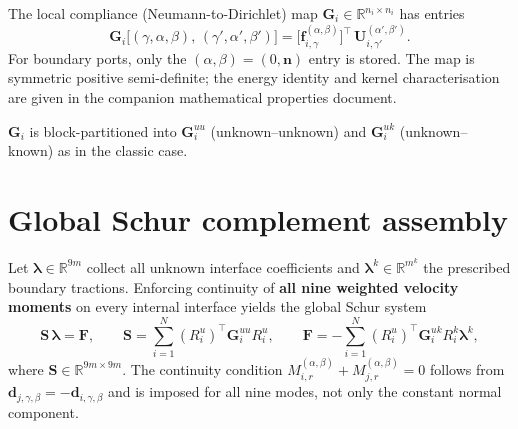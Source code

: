 \documentclass[11pt,a4paper]{article}
\newcommand{\R}{\mathbb{R}}
\newcommand{\normal}{\bm{n}}
\newcommand{\trac}{\bm{\lambda}}
\newcommand{\DtN}{\mathbf{G}}
\newcommand{\Schur}{\mathbf{S}}
\begin{document}
The local compliance (Neumann-to-Dirichlet) map
$\DtN_i \in \R^{n_i \times n_i}$ has entries
\begin{equation}\label{eq:dtn}
  \DtN_i\bigl[(\gamma,\alpha,\beta),\,(\gamma',\alpha',\beta')\bigr]
  = \bigl[\bm{f}_{i,\gamma}^{(\alpha,\beta)}\bigr]^\top\,
    \mathbf{U}_{i,\gamma'}^{(\alpha',\beta')}.
\end{equation}
For boundary ports, only the $(\alpha,\beta)=(0,\normal)$ entry is stored.
The map is symmetric positive semi-definite; the energy identity and
kernel characterisation are given in the companion mathematical
properties document.

$\DtN_i$ is block-partitioned into $\DtN_i^{uu}$ (unknown--unknown) and
$\DtN_i^{uk}$ (unknown--known) as in the classic case.

\section{Global Schur complement assembly}

Let $\trac \in \R^{9m}$ collect all unknown interface coefficients and
$\trac^k \in \R^{m^k}$ the prescribed boundary tractions.
Enforcing continuity of \textbf{all nine weighted velocity moments} on
every internal interface yields the global Schur system
\begin{equation}\label{eq:schur}
  \Schur\,\trac = \bm{F},\qquad
  \Schur = \sum_{i=1}^N (R_i^u)^\top \DtN_i^{uu} R_i^u,\qquad
  \bm{F} = -\sum_{i=1}^N (R_i^u)^\top \DtN_i^{uk} R_i^k \trac^k,
\end{equation}
where $\Schur \in \R^{9m \times 9m}$.  The continuity condition
$M_{i,r}^{(\alpha,\beta)} + M_{j,r}^{(\alpha,\beta)} = 0$ follows from
$\bm{d}_{j,\gamma,\beta} = -\bm{d}_{i,\gamma,\beta}$ and is imposed
for all nine modes, not only the constant normal component.
\end{document}
